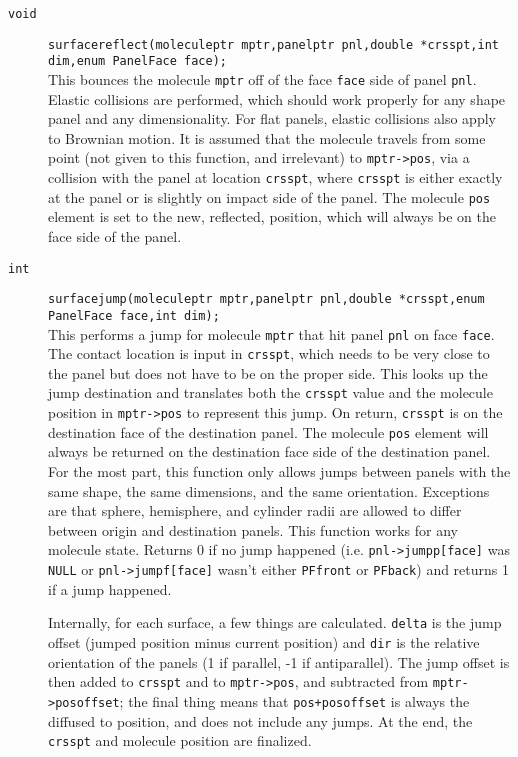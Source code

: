 \documentclass {book}
\begin{document}
\begin{description}
\item[\texttt{void}]
\texttt{surfacereflect(moleculeptr mptr,panelptr pnl,double *crsspt,int dim,enum PanelFace face);}
\hfill \\
This bounces the molecule \texttt{mptr} off of the face \texttt{face} side of panel \texttt{pnl}. Elastic collisions are performed, which should work properly for any shape panel and any dimensionality. For flat panels, elastic collisions also apply to Brownian motion. It is assumed that the molecule travels from some point (not given to this function, and irrelevant) to \texttt{mptr->pos}, via a collision with the panel at location \texttt{crsspt}, where \texttt{crsspt} is either exactly at the panel or is slightly on impact side of the panel. The molecule \texttt{pos} element is set to the new, reflected, position, which will always be on the face side of the panel.

\item[\texttt{int}]
\texttt{surfacejump(moleculeptr mptr,panelptr pnl,double *crsspt,enum PanelFace face,int dim);}
\hfill \\
This performs a jump for molecule \texttt{mptr} that hit panel \texttt{pnl} on face \texttt{face}. The contact location is input in \texttt{crsspt}, which needs to be very close to the panel but does not have to be on the proper side. This looks up the jump destination and translates both the \texttt{crsspt} value and the molecule position in \texttt{mptr->pos} to represent this jump. On return, \texttt{crsspt} is on the destination face of the destination panel. The molecule \texttt{pos} element will always be returned on the destination face side of the destination panel. For the most part, this function only allows jumps between panels with the same shape, the same dimensions, and the same orientation. Exceptions are that sphere, hemisphere, and cylinder radii are allowed to differ between origin and destination panels. This function works for any molecule state. Returns 0 if no jump happened (i.e. \texttt{pnl->jumpp[face]} was \texttt{NULL} or \texttt{pnl->jumpf[face]} wasn't either \texttt{PFfront} or \texttt{PFback}) and returns 1 if a jump happened.

Internally, for each surface, a few things are calculated. \texttt{delta} is the jump offset (jumped position minus current position) and \texttt{dir} is the relative orientation of the panels (1 if parallel, -1 if antiparallel). The jump offset is then added to \texttt{crsspt} and to \texttt{mptr->pos}, and subtracted from \texttt{mptr->posoffset}; the final thing means that \texttt{pos+posoffset} is always the diffused to position, and does not include any jumps. At the end, the \texttt{crsspt} and molecule position are finalized.


\end{description}
\end{document}
